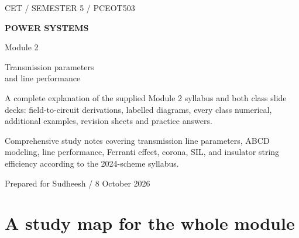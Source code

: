 \documentclass[11pt,a4paper]{article}
\newenvironment{Idea}[1]{\begin{tcolorbox}[colback=pale,colframe=teal,coltitle=white,title={#1}]}{\end{tcolorbox}}
\newcommand{\chapterstart}[2]{\clearpage\section{#1}\label{#2}}
\newcommand{\jj}{\mathrm j}
\begin{document}
\begin{titlepage}
\vspace*{12mm}
{\small\sffamily\color{teal}CET / SEMESTER 5 / PCEOT503}\par\vspace{16mm}
{\Huge\sffamily\bfseries\color{ink}POWER SYSTEMS}\par\vspace{6mm}
{\huge\sffamily\color{teal}Module 2}\par\vspace{10mm}
{\LARGE\sffamily Transmission parameters\\and line performance}\par\vspace{12mm}
\par\vspace{10mm}
\begin{Idea}{Built for understanding, derivation and exam preparation}
A complete explanation of the supplied Module 2 syllabus and both class slide decks: field-to-circuit derivations, labelled diagrams, every class numerical, additional examples, revision sheets and practice answers.
\end{Idea}
\vfill
{\small Comprehensive study notes covering transmission line parameters, ABCD modeling, line performance, Ferranti effect, corona, SIL, and insulator string efficiency according to the 2024-scheme syllabus.}\par\vspace{4mm}
{\small\sffamily Prepared for Sudheesh / 8 October 2026}
\end{titlepage}
\tableofcontents
\clearpage{}
\chapterstart{A study map for the whole module}{map}
\end{document}
